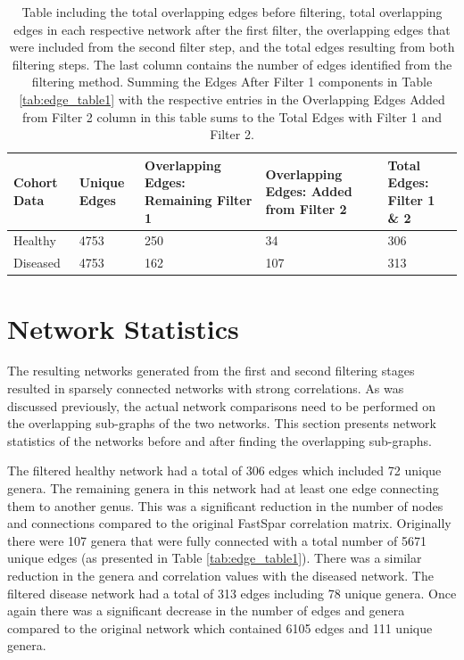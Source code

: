 \begin{table}[!hbt]
\centering
\begin{tabular}{p{} p{} p{} p{} p{}}
  \toprule
 Cohort Data & Unique Edges & Overlapping Edges: Remaining Filter 1 & Overlapping Edges: Added from Filter 2 & Total Edges: Filter 1 \& 2\\ 
 \midrule
 Healthy & 4753 & 250 &  34 & 306 \\ 
 Diseased & 4753 & 162 & 107 & 313 \\ 
  \bottomrule
\end{tabular}
\caption[Table including the total overlapping edges before filtering, total overlapping edges in each respective network after the first filter, the overlapping edges that were included from the second filter step, and the total edges resulting from both filtering steps.]{Table including the total overlapping edges before filtering, total overlapping edges in each respective network after the first filter, the overlapping edges that were included from the second filter step, and the total edges resulting from both filtering steps. The last column contains the number of edges identified from the filtering method. Summing the Edges After Filter 1 components in Table \ref{tab:edge_table1} with the respective entries in the Overlapping Edges Added from Filter 2 column in this table sums to the Total Edges with Filter 1 and Filter 2.}
\label{tab:edge_table2}
\end{table}

\section{Network Statistics}\label{results-netstat}

The resulting networks generated from the first and second filtering stages resulted in sparsely connected networks with strong correlations. As was discussed previously, the actual network comparisons need to be performed on the overlapping sub-graphs of the two networks. This section presents network statistics of the networks before and after finding the overlapping sub-graphs. 

The filtered healthy network had a total of 306 edges which included 72 unique genera. The remaining genera in this network had at least one edge connecting them to another genus. This was a significant reduction in the number of nodes and connections compared to the original FastSpar correlation matrix. Originally there were 107 genera that were fully connected with a total number of 5671 unique edges (as presented in Table \ref{tab:edge_table1}). There was a similar reduction in the genera and correlation values with the diseased network. The filtered disease network had a total of 313 edges including 78 unique genera. Once again there was a significant decrease in the number of edges and genera compared to the original network which contained 6105 edges and 111 unique genera.

